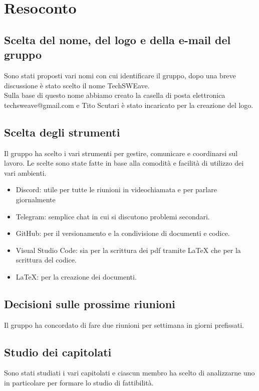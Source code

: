 \documentclass[a4paper]{article}
\begin{document}
    \section{Resoconto}
    
        \subsection{Scelta del nome, del logo e della e-mail del gruppo}
        Sono stati proposti vari nomi con cui identificare il gruppo, dopo una breve
        discussione è stato scelto il nome TechSWEave.\\
        Sulla base di questo nome abbiamo creato la casella di posta elettronica 
        techsweave@gmail.com e Tito Scutari è stato incaricato per la creazione del logo.
        
        \subsection{Scelta degli strumenti}
        Il gruppo ha scelto i vari strumenti per gestire, comunicare e coordinarsi sul lavoro.
        Le scelte sono state fatte in base alla comodità e facilità di utilizzo dei
        vari ambienti.
        \begin{itemize}
            \item Discord: utile per tutte le riunioni in videochiamata e per parlare giornalmente
            \item Telegram: semplice chat in cui si discutono problemi secondari.
            \item GitHub: per il versionamento e la condivisione di documenti e codice.
            \item Visual Studio Code: sia per la scrittura dei pdf tramite LaTeX che per la scrittura del codice.
            \item LaTeX: per la creazione dei documenti.
        \end{itemize}

        \subsection{Decisioni sulle prossime riunioni}
        Il gruppo ha concordato di fare due riunioni per settimana in giorni prefissati.

        \subsection{Studio dei capitolati}
        Sono stati studiati i vari capitolati e ciascun membro ha scelto di analizzarne uno in particolare per formare lo studio di fattibilità.
\end{document}
